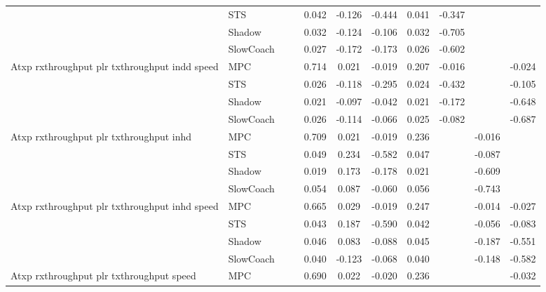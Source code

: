 \begin{tabular}{|l|l|*{9}{c|}}
                              & STS &       &        &     0.042 & -0.126 & -0.444 &  0.041 &  -0.347 &      &       \\
                              & Shadow &       &        &     0.032 & -0.124 & -0.106 &  0.032 &  -0.705 &      &       \\
                              & SlowCoach &       &        &     0.027 & -0.172 & -0.173 &  0.026 &  -0.602 &      &       \\
\midrule
Atxp rxthroughput plr txthroughput indd speed    & MPC &       &        &     0.714 &  0.021 & -0.019 &  0.207 &  -0.016 &      &   -0.024 \\
                              & STS &       &        &     0.026 & -0.118 & -0.295 &  0.024 &  -0.432 &      &   -0.105 \\
                              & Shadow &       &        &     0.021 & -0.097 & -0.042 &  0.021 &  -0.172 &      &   -0.648 \\
                              & SlowCoach &       &        &     0.026 & -0.114 & -0.066 &  0.025 &  -0.082 &      &   -0.687 \\
\midrule
Atxp rxthroughput plr txthroughput inhd    & MPC &       &        &     0.709 &  0.021 & -0.019 &  0.236 &      &  -0.016 &       \\
                              & STS &       &        &     0.049 &  0.234 & -0.582 &  0.047 &      &  -0.087 &       \\
                              & Shadow &       &        &     0.019 &  0.173 & -0.178 &  0.021 &      &  -0.609 &       \\
                              & SlowCoach &       &        &     0.054 &  0.087 & -0.060 &  0.056 &      &  -0.743 &       \\
\midrule
Atxp rxthroughput plr txthroughput inhd speed    & MPC &       &        &     0.665 &  0.029 & -0.019 &  0.247 &      &  -0.014 &   -0.027 \\
                              & STS &       &        &     0.043 &  0.187 & -0.590 &  0.042 &      &  -0.056 &   -0.083 \\
                              & Shadow &       &        &     0.046 &  0.083 & -0.088 &  0.045 &      &  -0.187 &   -0.551 \\
                              & SlowCoach &       &        &     0.040 & -0.123 & -0.068 &  0.040 &      &  -0.148 &   -0.582 \\
\midrule
Atxp rxthroughput plr txthroughput speed    & MPC &       &        &     0.690 &  0.022 & -0.020 &  0.236 &      &      &   -0.032 \\

\end{tabular}
